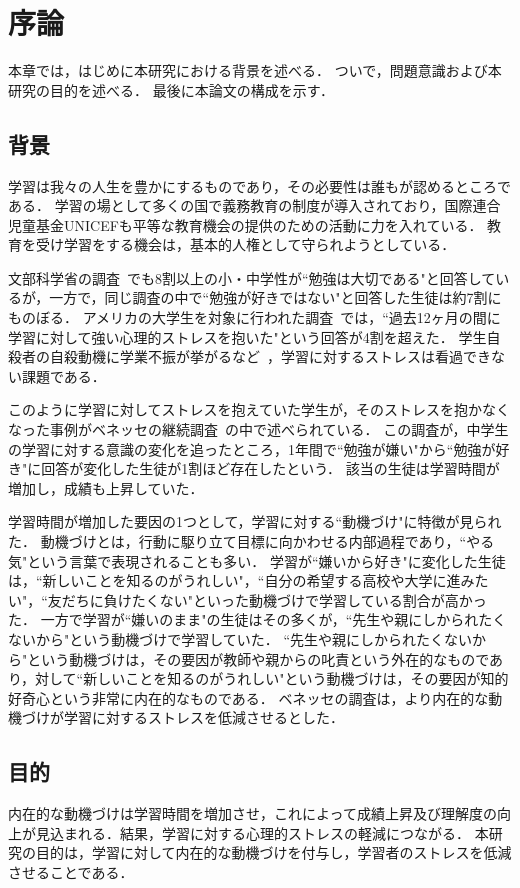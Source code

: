 \chapter{序論}
本章では，はじめに本研究における背景を述べる．
ついで，問題意識および本研究の目的を述べる．
最後に本論文の構成を示す．

\section{背景}
学習は我々の人生を豊かにするものであり，その必要性は誰もが認めるところである．
学習の場として多くの国で義務教育の制度が導入されており，国際連合児童基金UNICEFも平等な教育機会の提供のための活動に力を入れている．
教育を受け学習をする機会は，基本的人権として守られようとしている．

文部科学省の調査~\cite{monkasho}でも8割以上の小・中学性が``勉強は大切である"と回答しているが，一方で，同じ調査の中で``勉強が好きではない"と回答した生徒は約7割にものぼる．
アメリカの大学生を対象に行われた調査~\cite{acha}では，``過去12ヶ月の間に学習に対して強い心理的ストレスを抱いた"という回答が4割を超えた．
学生自殺者の自殺動機に学業不振が挙がるなど~\cite{kourousho}，学習に対するストレスは看過できない課題である．

このように学習に対してストレスを抱えていた学生が，そのストレスを抱かなくなった事例がベネッセの継続調査~\cite{benesse}の中で述べられている．
この調査が，中学生の学習に対する意識の変化を追ったところ，1年間で``勉強が嫌い"から``勉強が好き"に回答が変化した生徒が1割ほど存在したという．
該当の生徒は学習時間が増加し，成績も上昇していた．

学習時間が増加した要因の1つとして，学習に対する``動機づけ"に特徴が見られた．
動機づけとは，行動に駆り立て目標に向かわせる内部過程であり，``やる気"という言葉で表現されることも多い．
学習が``嫌いから好き"に変化した生徒は，``新しいことを知るのがうれしい"，``自分の希望する高校や大学に進みたい"，``友だちに負けたくない"といった動機づけで学習している割合が高かった．
一方で学習が``嫌いのまま"の生徒はその多くが，``先生や親にしかられたくないから"という動機づけで学習していた．
``先生や親にしかられたくないから"という動機づけは，その要因が教師や親からの叱責という外在的なものであり，対して``新しいことを知るのがうれしい"という動機づけは，その要因が知的好奇心という非常に内在的なものである．
ベネッセの調査は，より内在的な動機づけが学習に対するストレスを低減させるとした．

\section{目的}
内在的な動機づけは学習時間を増加させ，これによって成績上昇及び理解度の向上が見込まれる．結果，学習に対する心理的ストレスの軽減につながる．
本研究の目的は，学習に対して内在的な動機づけを付与し，学習者のストレスを低減させることである．

